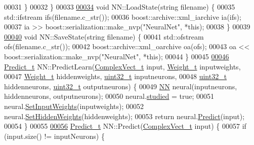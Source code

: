 \begin{DoxyCode}
00031     \}
00032 \}
00033 
\hypertarget{_n_n_8cpp_source_l00034}{}\hyperlink{class_soil_math_1_1_n_n_aaa63195dc11ca8c02f3ce044a5d086b5}{00034} \textcolor{keywordtype}{void} NN::LoadState(\textcolor{keywordtype}{string} filename) \{
00035   std::ifstream ifs(filename.c\_str());
00036   boost::archive::xml\_iarchive ia(ifs);
00037   ia >> boost::serialization::make\_nvp(\textcolor{stringliteral}{"NeuralNet"}, *\textcolor{keyword}{this});
00038 \}
00039 
\hypertarget{_n_n_8cpp_source_l00040}{}\hyperlink{class_soil_math_1_1_n_n_a970fda7e79dd4c34f2c3be69afaf4742}{00040} \textcolor{keywordtype}{void} NN::SaveState(\textcolor{keywordtype}{string} filename) \{
00041   std::ofstream ofs(filename.c\_str());
00042   boost::archive::xml\_oarchive oa(ofs);
00043   oa << boost::serialization::make\_nvp(\textcolor{stringliteral}{"NeuralNet"}, *\textcolor{keyword}{this});
00044 \}
00045 
\hypertarget{_n_n_8cpp_source_l00046}{}\hyperlink{class_soil_math_1_1_n_n_ac758bdef758439af30a62c486dff79ca}{00046} \hyperlink{struct_predict__struct}{Predict\_t} NN::PredictLearn(\hyperlink{_soil_math_types_8h_a7567e521c2b2c408dcb62dbff72390f7}{ComplexVect\_t} input, \hyperlink{_soil_math_types_8h_ac56ad2b88186620fd0de0d213aa715dd}{Weight\_t} inputweights,
00047                            \hyperlink{_soil_math_types_8h_ac56ad2b88186620fd0de0d213aa715dd}{Weight\_t} hiddenweights, \hyperlink{_soil_math_types_8h_a435d1572bf3f880d55459d9805097f62}{uint32\_t} inputneurons,
00048                            \hyperlink{_soil_math_types_8h_a435d1572bf3f880d55459d9805097f62}{uint32\_t} hiddenneurons, \hyperlink{_soil_math_types_8h_a435d1572bf3f880d55459d9805097f62}{uint32\_t} outputneurons) \{
00049   \hyperlink{class_soil_math_1_1_n_n}{NN} neural(inputneurons, hiddenneurons, outputneurons);
00050   neural.\hyperlink{class_soil_math_1_1_n_n_aed36297c9221a837fee94f4774b614bf}{studied} = \textcolor{keyword}{true};
00051   neural.\hyperlink{class_soil_math_1_1_n_n_a411371d8297e9d1ff10c919d1293d80e}{SetInputWeights}(inputweights);
00052   neural.\hyperlink{class_soil_math_1_1_n_n_a8465f4fd2aebe181601c4be31df47ffd}{SetHiddenWeights}(hiddenweights);
00053   \textcolor{keywordflow}{return} neural.\hyperlink{class_soil_math_1_1_n_n_aa7f23fcdb8383a74586c9c30b8bc0af7}{Predict}(input);
00054 \}
00055 
\hypertarget{_n_n_8cpp_source_l00056}{}\hyperlink{class_soil_math_1_1_n_n_aa7f23fcdb8383a74586c9c30b8bc0af7}{00056} \hyperlink{struct_predict__struct}{Predict\_t} NN::Predict(\hyperlink{_soil_math_types_8h_a7567e521c2b2c408dcb62dbff72390f7}{ComplexVect\_t} input) \{
00057   \textcolor{keywordflow}{if} (input.size() != inputNeurons) \{

\end{DoxyCode}
